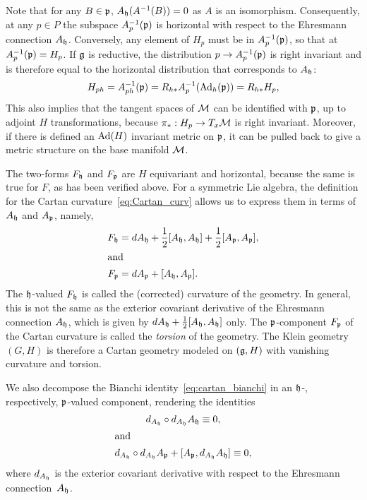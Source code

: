 \documentclass[
final,
11pt,
a4paper,
DIV=11,
headinclude=true,
footinclude=false,
bibliography=totoc,
twoside=true,  %
BCOR=5mm
]{scrbook}
\begin{document}
Note that for any $B \in \mathfrak{p}$, $A_\mathfrak{h}(A^{-1}(B)) = 0$ as 
$A$ is an isomorphism. Consequently, at any $p \in P$ the 
subspace $A_p^{-1}(\mathfrak{p})$ is horizontal with respect to the 
Ehresmann connection $A_\mathfrak{h}$. Conversely, any element of $H_p$ 
must be in $A_p^{-1}(\mathfrak{p})$, so that at $A_p^{-1}(\mathfrak{p}) = 
H_p$. If $\mathfrak{g}$ is reductive, the distribution $p \to 
A_p^{-1}(\mathfrak{p})$ is right invariant and is therefore equal to 
the horizontal distribution that corresponds to $A_\mathfrak{h}$:
\begin{equation*}
  H_{ph} = A_{ph}^{-1}(\mathfrak{p})
    = R_{h*}A_p^{-1}( \operatorname{Ad}_h( \mathfrak{p}))
    = R_{h*}H_p,
\end{equation*}
This also implies that the tangent spaces of $\mathcal{M}$ can be 
identified with $\mathfrak{p}$, up to adjoint $H$ transformations, 
because $\pi_* : H_p \to T_x\mathcal{M}$ is right invariant. Moreover, 
if there is defined an $\operatorname{Ad}(H)$ invariant metric on $\mathfrak{p}$, it 
can be pulled back to give a metric structure on the base 
manifold $\mathcal{M}$.

The two-forms $F_\mathfrak{h}$ and $F_\mathfrak{p}$ are $H$ equivariant and 
horizontal, because the same is true for $F$, as has been 
verified above. For a symmetric Lie algebra, the definition for 
the Cartan curvature~\eqref{eq:Cartan_curv} allows us to express 
them in terms of $A_\mathfrak{h}$ and $A_\mathfrak{p}$, namely,
\begin{subequations}
\label{eqs:curv_tors_expl}
\begin{align}
  \label{eq:curv_expl}
  F_\mathfrak{h} &= dA_\mathfrak{h} + \frac{1}{2} 
  [A_\mathfrak{h}, A_\mathfrak{h}]  + \frac{1}{2}
  [A_\mathfrak{p},A_\mathfrak{p}],
  \\
\shortintertext{and}
  \label{eq:tors_expl}
  F_\mathfrak{p} &= dA_\mathfrak{p} + 
  [A_\mathfrak{h},A_\mathfrak{p}].
\end{align}
\end{subequations}
The $\mathfrak{h}$-valued $F_\mathfrak{h}$ is called the (corrected) 
curvature of the geometry. In general, this is not the same as 
the exterior covariant derivative of the Ehresmann connection 
$A_\mathfrak{h}$, which is given by $dA_\mathfrak{h} + \frac{1}{2} 
[A_\mathfrak{h}, A_\mathfrak{h}]$ only. The $\mathfrak{p}$-component 
$F_\mathfrak{p}$ of the Cartan curvature is called the \emph{torsion} 
of the geometry. The Klein geometry $(G,H)$ is therefore a Cartan 
geometry modeled on $(\mathfrak{g},H)$ with vanishing curvature and 
torsion.

We also decompose the Bianchi identity~\eqref{eq:cartan_bianchi} 
in an $\mathfrak{h}$-, respectively, $\mathfrak{p}$-valued component, 
rendering the identities
\begin{subequations}
\label{eqs:bianchi_ids_decomp}
\begin{gather}
  d_{A_\mathfrak{h}} \circ d_{A_\mathfrak{h}} A_\mathfrak{h} \equiv 0,\\
\shortintertext{and}
  d_{A_\mathfrak{h}} \circ d_{A_\mathfrak{h}} A_\mathfrak{p} + [A_\mathfrak{p}, 
  d_{A_\mathfrak{h}} A_\mathfrak{h}] \equiv 0,
\end{gather}
\end{subequations}
where $d_{A_\mathfrak{h}}$ is the exterior covariant derivative with 
respect to the Ehresmann connection~$A_\mathfrak{h}$.
\end{document}
